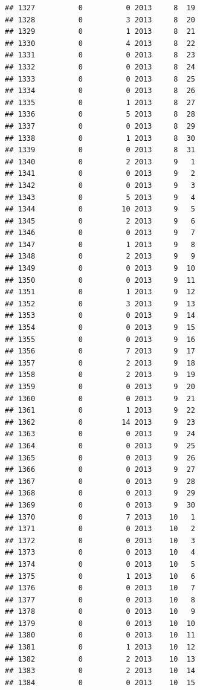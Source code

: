 \documentclass[
]{article}
\begin{document}
\begin{verbatim}
## 1327          0          0 2013     8  19
## 1328          0          3 2013     8  20
## 1329          0          1 2013     8  21
## 1330          0          4 2013     8  22
## 1331          0          0 2013     8  23
## 1332          0          0 2013     8  24
## 1333          0          0 2013     8  25
## 1334          0          0 2013     8  26
## 1335          0          1 2013     8  27
## 1336          0          5 2013     8  28
## 1337          0          0 2013     8  29
## 1338          0          1 2013     8  30
## 1339          0          0 2013     8  31
## 1340          0          2 2013     9   1
## 1341          0          0 2013     9   2
## 1342          0          0 2013     9   3
## 1343          0          5 2013     9   4
## 1344          0         10 2013     9   5
## 1345          0          2 2013     9   6
## 1346          0          0 2013     9   7
## 1347          0          1 2013     9   8
## 1348          0          2 2013     9   9
## 1349          0          0 2013     9  10
## 1350          0          0 2013     9  11
## 1351          0          1 2013     9  12
## 1352          0          3 2013     9  13
## 1353          0          0 2013     9  14
## 1354          0          0 2013     9  15
## 1355          0          0 2013     9  16
## 1356          0          7 2013     9  17
## 1357          0          2 2013     9  18
## 1358          0          2 2013     9  19
## 1359          0          0 2013     9  20
## 1360          0          0 2013     9  21
## 1361          0          1 2013     9  22
## 1362          0         14 2013     9  23
## 1363          0          0 2013     9  24
## 1364          0          0 2013     9  25
## 1365          0          0 2013     9  26
## 1366          0          0 2013     9  27
## 1367          0          0 2013     9  28
## 1368          0          0 2013     9  29
## 1369          0          0 2013     9  30
## 1370          0          7 2013    10   1
## 1371          0          0 2013    10   2
## 1372          0          0 2013    10   3
## 1373          0          0 2013    10   4
## 1374          0          0 2013    10   5
## 1375          0          1 2013    10   6
## 1376          0          0 2013    10   7
## 1377          0          0 2013    10   8
## 1378          0          0 2013    10   9
## 1379          0          0 2013    10  10
## 1380          0          0 2013    10  11
## 1381          0          1 2013    10  12
## 1382          0          2 2013    10  13
## 1383          0          2 2013    10  14
## 1384          0          0 2013    10  15

\end{verbatim}
\end{document}
